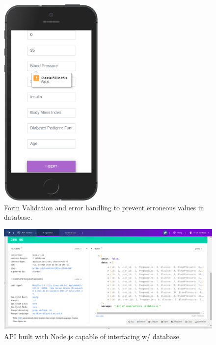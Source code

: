\documentclass[12pt]{article}
\begin{document}
\begin{figure}[ht]
\centering
\includegraphics[width=0.45\textwidth]{8se.png}
\caption{\label{fig:57} Form Validation and error handling to prevent erroneous values in database.}
\end{figure}

{
\clearpage
\begin{landscape}
\begin{figure}[ht]
\centering
\includegraphics[width=1.5\textwidth]{nodejsapi.png}
\caption{\label{fig:58} API built with Node.js capable of interfacing w/ database.}
\end{figure}
\end{landscape}
}
\clearpage
\newpage
\nocite{*}
 

\end{document}
